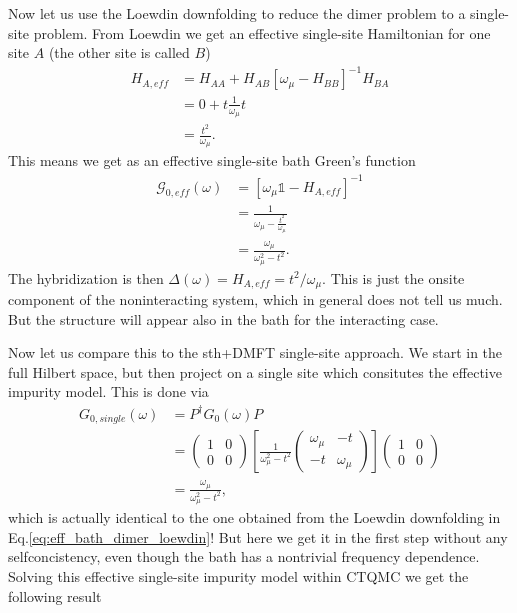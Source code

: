 \documentclass[12pt,a4paper]{scrartcl}
\numberwithin{equation}{section}
\newcommand{\unity}{\mathds{1}}
\begin{document}
Now let us use the Loewdin downfolding to reduce the dimer problem to a single-site problem.
From Loewdin we get an effective single-site Hamiltonian for one site $A$ (the other site is called $B$)
\begin{align}
 H_{A,eff} &= H_{AA} + H_{AB}[ \omega_{\mu} - H_{BB} ]^{-1} H_{BA} \nonumber\\
 &= 0 + t\frac{1}{\omega_{\mu}} t \nonumber\\
 &=  \frac{t^2}{\omega_{\mu}} .
\end{align}
This means we get as an effective single-site bath Green's function
\begin{align}
 \mathcal{G}_{0,eff}(\omega) 
 &= \left[\omega_{\mu} \unity -H_{A,eff}  \right]^{-1} \nonumber \\ 
 &=\frac{1}{\omega_{\mu} -\frac{t^2}{\omega_{\mu}}}  \nonumber \\
 &=\frac{\omega_{\mu}}{ \omega_{\mu}^2 - t^2 }  \label{eq:eff_bath_dimer_loewdin}.
\end{align}
The hybridization is then $\Delta(\omega) =H_{A,eff}  = t^2/\omega_{\mu}$.
This is just the onsite component of the noninteracting system, which in general does not 
tell us much. But the structure will appear also in the bath for the interacting case.

\bigskip

Now let us compare this to the sth+DMFT single-site approach.
We start in the full Hilbert space, but then project on a single site
which consitutes the effective impurity model. This is done via
\begin{align}
 G_{0,single}(\omega)
 &= P^{\dagger} G_{0}(\omega) P \nonumber\\
 &= \begin{pmatrix}
     1 & 0 \\ 0 & 0
    \end{pmatrix}
\left[ \frac{1}{\omega_{\mu}^2-t^2} 
   \begin{pmatrix}
     \omega_{\mu} & -t \\ -t  & \omega_{\mu}
    \end{pmatrix} \right]    
    \begin{pmatrix}
     1 & 0 \\ 0 & 0
    \end{pmatrix} \nonumber\\
&=     \frac{\omega_{\mu}}{ \omega_{\mu}^2 - t^2 }  ,
\end{align}
which is actually identical to the one obtained from the Loewdin downfolding in Eq.\eqref{eq:eff_bath_dimer_loewdin}!
But here we get it in the first step without any selfconcistency, even though the bath has a nontrivial frequency dependence.
Solving this effective single-site impurity model within CTQMC we get the following result
\end{document}
